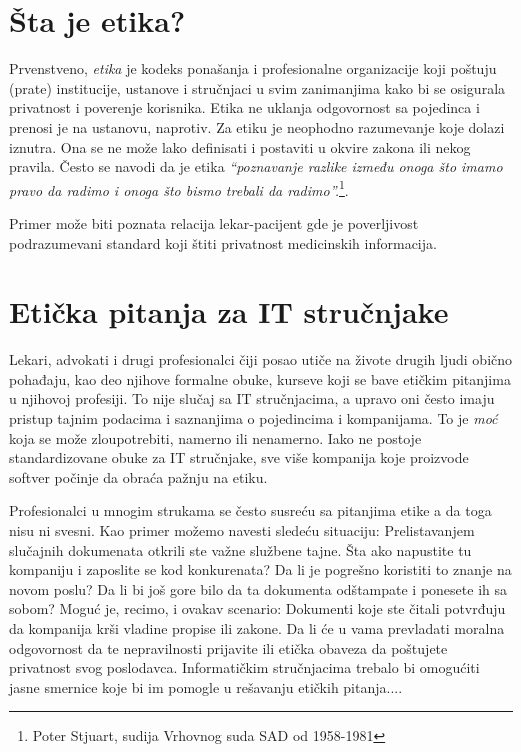 \documentclass[a4paper]{article}
\begin{document}
{\section{Šta je etika?}

Prvenstveno, \emph{etika} je kodeks ponašanja i profesionalne organizacije koji poštuju (prate) institucije, ustanove i stručnjaci u svim zanimanjima kako bi se osigurala privatnost i poverenje korisnika. Etika ne uklanja odgovornost sa pojedinca i prenosi je na ustanovu, naprotiv. Za etiku je neophodno razumevanje koje dolazi iznutra. Ona se ne može lako definisati i postaviti u okvire zakona ili nekog pravila. 
Često se navodi da je etika \emph{“poznavanje razlike između onoga što imamo pravo da radimo i onoga što bismo trebali da radimo”.}\footnote{Poter Stjuart, sudija Vrhovnog suda SAD od 1958-1981}.

Primer može biti poznata relacija lekar-pacijent gde je poverljivost podrazumevani standard koji štiti privatnost medicinskih informacija.

\section{Etička pitanja za IT stručnjake}

Lekari, advokati i drugi profesionalci čiji posao utiče na živote drugih ljudi obično pohađaju, kao deo njihove formalne obuke, kurseve koji se bave etičkim pitanjima u njihovoj profesiji. To nije slučaj sa IT stručnjacima, a upravo oni često imaju pristup tajnim podacima i saznanjima o pojedincima i kompanijama. To je \emph{moć} koja se može zloupotrebiti, namerno ili nenamerno. Iako ne postoje standardizovane obuke za IT stručnjake, sve više kompanija koje proizvode softver počinje da obraća pažnju na etiku.

Profesionalci u mnogim strukama se često susreću sa pitanjima etike a da toga nisu ni svesni. Kao primer možemo navesti sledeću situaciju: Prelistavanjem slučajnih dokumenata otkrili ste važne službene tajne. Šta ako napustite tu kompaniju i zaposlite se kod konkurenata? Da li je pogrešno koristiti to znanje na novom poslu? Da li bi još gore bilo da ta dokumenta odštampate i ponesete ih sa sobom?
Moguć je, recimo, i ovakav scenario: Dokumenti koje ste čitali potvrđuju da kompanija krši vladine propise ili zakone. Da li će u vama prevladati moralna odgovornost da te nepravilnosti prijavite ili etička obaveza da poštujete privatnost svog poslodavca.
Informatičkim stručnjacima trebalo bi omogućiti jasne smernice koje bi im pomogle u rešavanju etičkih pitanja....

}
\end{document}
